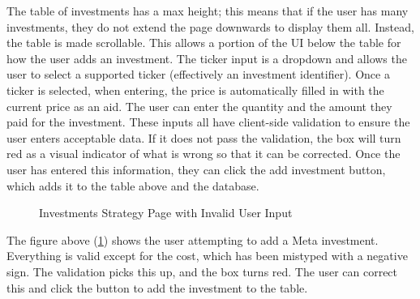 The table of investments has a max height; this means that if the user has many investments, they do not extend the page downwards to display them all. Instead, the table is made scrollable. This allows a portion of the UI below the table for how the user adds an investment. The ticker input is a dropdown and allows the user to select a supported ticker (effectively an investment identifier). Once a ticker is selected, when entering, the price is automatically filled in with the current price as an aid. The user can enter the quantity and the amount they paid for the investment. These inputs all have client-side validation to ensure the user enters acceptable data. If it does not pass the validation, the box will turn red as a visual indicator of what is wrong so that it can be corrected. Once the user has entered this information, they can click the add investment button, which adds it to the table above and the database.

\begin{figure}[H]
	\centering
	\caption{Investments Strategy Page with Invalid User Input}
	\label{fig:InvestmentsError}
\end{figure}

The figure above (\ref{fig:InvestmentsError}) shows the user attempting to add a Meta investment. Everything is valid except for the cost, which has been mistyped with a negative sign. The validation picks this up, and the box turns red. The user can correct this and click the button to add the investment to the table.

